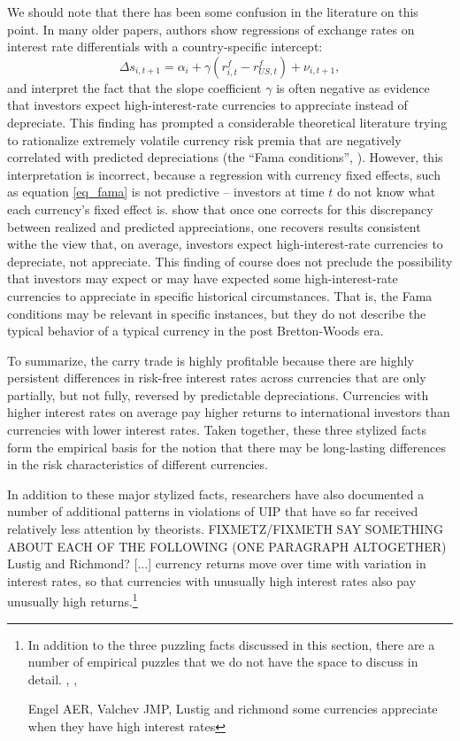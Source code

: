 \documentclass{ar-1col}
\begin{document}
We should note that 
there has been some confusion in the literature on this point. 
In many older papers, authors show regressions of exchange rates on 
interest rate differentials with a country-specific intercept:
\begin{equation}
    \Delta s_{i,t+1} 
    = \alpha_i + \gamma \left(r^f_{i, t} - r^f_{US, t}\right) + \nu_{i, t+1},
\label{eq_fama} 
\end{equation}
and interpret the fact that the slope coefficient $\gamma$ is often 
negative as evidence that investors expect high-interest-rate 
currencies to appreciate instead of depreciate. This finding has 
prompted a considerable theoretical literature trying to rationalize 
extremely volatile currency risk premia that are negatively correlated 
with predicted depreciations (the ``Fama conditions'', \citet{Backusetal2001}). However, this
interpretation is incorrect, because a regression with currency fixed
effects, such as equation \eqref{eq_fama} is not predictive -- investors at
time $t$ do not know what each currency's fixed effect is. \citet{HassanMano2015} show that once one
corrects for this discrepancy between realized and predicted
appreciations, one recovers results consistent withe the view that, on
average, investors expect high-interest-rate currencies to depreciate,
not appreciate. This finding of course does not preclude the possibility that investors may expect or may have expected some high-interest-rate currencies to appreciate in specific historical circumstances. That is, the Fama conditions may be relevant in specific instances, but they do not describe the typical behavior of a typical currency in the post Bretton-Woods era. 

To summarize, the carry trade is highly profitable because there are 
highly persistent differences in risk-free interest rates across 
currencies that are only partially, but not fully, reversed by predictable 
depreciations. Currencies with higher interest rates on average pay 
higher returns to international investors than currencies with lower 
interest rates. Taken together, these three stylized facts form the empirical basis for the notion that there may be long-lasting differences in the risk characteristics of different currencies.

In addition to these major stylized facts, researchers have also documented a number of additional patterns in violations of UIP that have so far received relatively less attention by theorists. 
FIXMETZ/FIXMETH SAY SOMETHING ABOUT EACH OF THE FOLLOWING (ONE PARAGRAPH ALTOGETHER)
\citet{ChinnMeredith2004}
\citet{LRV2014}
\citet{LustigStathopoulosVerdelhan2019}
Lustig and Richmond?
[...]
currency returns move over time with variation in interest rates, 
so that currencies with unusually high interest rates also pay 
unusually high returns.\footnote{In addition to the three puzzling
facts discussed in this section, there are a number of empirical 
puzzles that we do not have the space to discuss in detail. 
\citet{LRV2014}, \citet{ChinnMeredith2004}, \citet{LustigStathopoulosVerdelhan2019}
\citet{}

Engel AER, Valchev JMP, 
Lustig and richmond some currencies appreciate when they have 
high interest rates}
\end{document}
